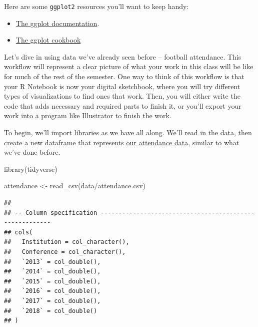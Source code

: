\documentclass[
]{book}
\newenvironment{Shaded}{\begin{snugshade}}{\end{snugshade}}
\newcommand{\FunctionTok}[1]{\textcolor[rgb]{0.00,0.00,0.00}{#1}}
\newcommand{\NormalTok}[1]{#1}
\newcommand{\OtherTok}[1]{\textcolor[rgb]{0.56,0.35,0.01}{#1}}
\newcommand{\StringTok}[1]{\textcolor[rgb]{0.31,0.60,0.02}{#1}}
\providecommand{\tightlist}{%
  \setlength{\itemsep}{0pt}\setlength{\parskip}{0pt}}
\begin{document}
Here are some \texttt{ggplot2} resources you'll want to keep handy:

\begin{itemize}
\tightlist
\item
  \href{http://ggplot2.tidyverse.org/reference/index.html}{The ggplot documentation}.
\item
  \href{http://www.cookbook-r.com/Graphs/}{The ggplot cookbook}
\end{itemize}

Let's dive in using data we've already seen before -- football attendance. This workflow will represent a clear picture of what your work in this class will be like for much of the rest of the semester. One way to think of this workflow is that your R Notebook is now your digital sketchbook, where you will try different types of visualizations to find ones that work. Then, you will either write the code that adds necessary and required parts to finish it, or you'll export your work into a program like Illustrator to finish the work.

To begin, we'll import libraries as we have all along. We'll read in the data, then create a new dataframe that represents \href{https://unl.box.com/s/oajabnn5614s22jstgcd9ojxo2njn6jt}{our attendance data}, similar to what we've done before.

\begin{Shaded}
\begin{Highlighting}[]
\FunctionTok{library}\NormalTok{(tidyverse)}
\end{Highlighting}
\end{Shaded}

\begin{Shaded}
\begin{Highlighting}[]
\NormalTok{attendance }\OtherTok{\textless{}{-}} \FunctionTok{read\_csv}\NormalTok{(}\StringTok{\textquotesingle{}data/attendance.csv\textquotesingle{}}\NormalTok{)}
\end{Highlighting}
\end{Shaded}

\begin{verbatim}
## 
## -- Column specification --------------------------------------------------------
## cols(
##   Institution = col_character(),
##   Conference = col_character(),
##   `2013` = col_double(),
##   `2014` = col_double(),
##   `2015` = col_double(),
##   `2016` = col_double(),
##   `2017` = col_double(),
##   `2018` = col_double()
## )
\end{verbatim}
\end{document}
